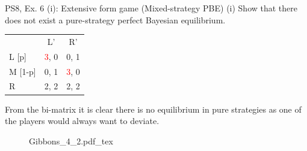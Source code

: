 \begin{frame}{PS8, Ex. 6 (i): Extensive form game (Mixed-strategy PBE)}
    (i) Show that there does not exist a pure-strategy perfect Bayesian equilibrium.
    \begin{multicols}{2}
      \begin{table}
        \begin{tabular}{l|c|c|}
          \multicolumn{1}{c}{} & \multicolumn{1}{c}{L'} & \multicolumn{1}{c}{R'} \\\cline{2-3}
          L [p]   & \textcolor{red}{3}, 0 & 0, \color{blue}1 \\\cline{2-3}
          M [1-p] & 0, \color{blue}1 & \textcolor{red}{3}, 0 \\\cline{2-3}
          R       & 2, \color{blue}2 & 2, \color{blue}2 \\\cline{2-3}
        \end{tabular}
      \end{table} \vspace{-4pt}
      From the bi-matrix it is clear there is no equilibrium in pure strategies as one of the players would always want to deviate.
      \vfill\null\columnbreak
      \begin{figure}[!h]
        \center {}
        {Gibbons_4_2.pdf_tex}
      \end{figure}
      \vfill\null
    \end{multicols}
\end{frame}


